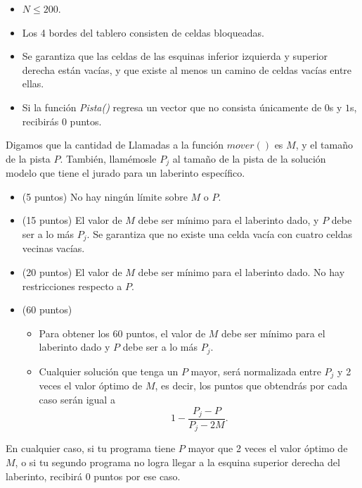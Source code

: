 \documentclass[12pt]{scrartcl}
\begin{document}
        \begin{itemize}
            \item $N \le 200$.
            \item Los 4 bordes del tablero consisten de celdas bloqueadas.
            \item Se garantiza que las celdas de las esquinas inferior izquierda y superior derecha están vacías, y que existe al menos un camino de celdas vacías entre ellas.
            \item Si la función \textit{Pista()} regresa un vector que no consista únicamente de $0$s y $1$s, recibirás 0 puntos.
        \end{itemize}
        

    Digamos que la cantidad de Llamadas a la función $mover()$ es $M$, y el tamaño de la pista $P$.
    También, llamémosle $P_j$ al tamaño de la pista de la solución modelo que tiene el jurado para un laberinto específico. 

    \begin{itemize}
        \item (5 puntos) No hay ningún límite sobre $M$ o $P$.
        \item (15 puntos) El valor de $M$ debe ser mínimo para el laberinto dado, y $P$ debe ser a lo más $P_j$. Se garantiza que no existe una celda vacía con cuatro celdas vecinas vacías.
        \item (20 puntos) El valor de $M$ debe ser mínimo para el laberinto dado. No hay restricciones respecto a $P$.
        \item (60 puntos) 
        \begin{itemize}
            \item Para obtener los 60 puntos, el valor de $M$ debe ser mínimo para el laberinto dado y $P$ debe ser a lo más  $P_j$.
            \item Cualquier solución que tenga un $P$ mayor, será normalizada entre $P_j$ y 2 veces el valor óptimo de $M$, es decir, los puntos que obtendrás por cada caso serán igual a
            \[1 - \frac{P_j - P}{P_j - 2M}.\]
        \end{itemize}
    \end{itemize}
    En cualquier caso, si tu programa tiene $P$ mayor que 2 veces el valor óptimo de $M$, o si tu segundo programa no logra llegar a la esquina superior derecha del laberinto, recibirá 0 puntos por ese caso.
\end{document}
